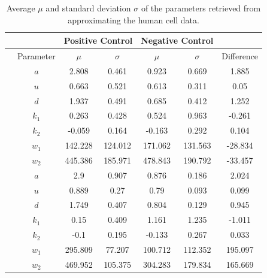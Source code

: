 \begin{table}[h!]
	\centering
	\begin{tabular}{|c|c|c|c|c|c|c|}
		\hline
		& & \multicolumn{2}{|c|}{Positive Control} & \multicolumn{2}{|c|}{Negative Control} & \\ 
		\hline
		& Parameter & $\mu$ & $\sigma$ & $\mu$ & $\sigma$ & Difference \\ 
		\hline
		\multirow{7}{*}{\rotatebox[origin=c]{90}{human cells}} & $a$ & 2.808 & 0.461 & 0.923 & 0.669 & 1.885\\
		\cline{2-7}
		& $u$ & 0.663 & 0.521 & 0.613 & 0.311 & 0.05\\
		\cline{2-7}
		& $d$ & 1.937 & 0.491 & 0.685 & 0.412 & 1.252\\
		\cline{2-7}
		& $k_1$ & 0.263 & 0.428 & 0.524 & 0.963 & -0.261 \\
		\cline{2-7}
		& $k_2$ & -0.059 & 0.164 & -0.163 & 0.292 & 0.104 \\
		\cline{2-7}
		& $w_1$ & 142.228 & 124.012 & 171.062 & 131.563 & -28.834 \\
		\cline{2-7}
		& $w_2$ & 445.386 & 185.971 & 478.843 & 190.792 & -33.457 \\
		\hline
		\multirow{7}{*}{\rotatebox[origin=c]{90}{mouse cells}} & $a$ & 2.9 & 0.907 & 0.876 & 0.186 & 2.024 \\
		\cline{2-7}
		& $u$ & 0.889 & 0.27 & 0.79 & 0.093 & 0.099 \\
		\cline{2-7}
		& $d$ & 1.749 & 0.407 & 0.804 & 0.129 & 0.945 \\
		\cline{2-7}
		& $k_1$ & 0.15 & 0.409 & 1.161 & 1.235 & -1.011 \\
		\cline{2-7}
		& $k_2$ & -0.1 & 0.195 & -0.133 & 0.267 & 0.033 \\
		\cline{2-7}
		& $w_1$ & 295.809 & 77.207 & 100.712 & 112.352 & 195.097 \\
		\cline{2-7}
		& $w_2$ & 469.952 & 105.375 & 304.283 & 179.834 & 165.669 \\
		\hline
	\end{tabular}
	\caption{Average $\mu$ and standard deviation $\sigma$ of the parameters retrieved from\\ approximating the human cell data.}
	\label{tab:statistics_parameters}
\end{table}

